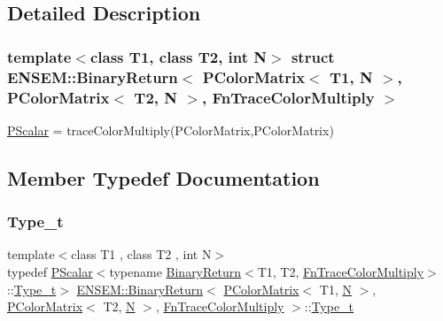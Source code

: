 \subsection{Detailed Description}
\subsubsection*{template$<$class T1, class T2, int N$>$\newline
struct E\+N\+S\+E\+M\+::\+Binary\+Return$<$ P\+Color\+Matrix$<$ T1, N $>$, P\+Color\+Matrix$<$ T2, N $>$, Fn\+Trace\+Color\+Multiply $>$}

\mbox{\hyperlink{classENSEM_1_1PScalar}{P\+Scalar}} = trace\+Color\+Multiply(\+P\+Color\+Matrix,\+P\+Color\+Matrix) 

\subsection{Member Typedef Documentation}
\mbox{\label{structENSEM_1_1BinaryReturn_3_01PColorMatrix_3_01T1_00_01N_01_4_00_01PColorMatrix_3_01T2_00_01N_a47a4c46ca38f78d2b12e618a0cca27a_a2e75e25e722e5b033ed977551768c19c}} 
\subsubsection{\texorpdfstring{Type\_t}{Type\_t}\hspace{0.1cm}{\footnotesize\ttfamily [1/2]}}
{\footnotesize\ttfamily template$<$class T1 , class T2 , int N$>$ \\
typedef \mbox{\hyperlink{classENSEM_1_1PScalar}{P\+Scalar}}$<$typename \mbox{\hyperlink{structENSEM_1_1BinaryReturn}{Binary\+Return}}$<$T1, T2, \mbox{\hyperlink{structENSEM_1_1FnTraceColorMultiply}{Fn\+Trace\+Color\+Multiply}}$>$\+::\mbox{\hyperlink{structENSEM_1_1BinaryReturn_3_01PColorMatrix_3_01T1_00_01N_01_4_00_01PColorMatrix_3_01T2_00_01N_a47a4c46ca38f78d2b12e618a0cca27a_a2e75e25e722e5b033ed977551768c19c}{Type\+\_\+t}}$>$ \mbox{\hyperlink{structENSEM_1_1BinaryReturn}{E\+N\+S\+E\+M\+::\+Binary\+Return}}$<$ \mbox{\hyperlink{classENSEM_1_1PColorMatrix}{P\+Color\+Matrix}}$<$ T1, \mbox{\hyperlink{operator__name__util_8cc_a7722c8ecbb62d99aee7ce68b1752f337}{N}} $>$, \mbox{\hyperlink{classENSEM_1_1PColorMatrix}{P\+Color\+Matrix}}$<$ T2, \mbox{\hyperlink{operator__name__util_8cc_a7722c8ecbb62d99aee7ce68b1752f337}{N}} $>$, \mbox{\hyperlink{structENSEM_1_1FnTraceColorMultiply}{Fn\+Trace\+Color\+Multiply}} $>$\+::\mbox{\hyperlink{structENSEM_1_1BinaryReturn_3_01PColorMatrix_3_01T1_00_01N_01_4_00_01PColorMatrix_3_01T2_00_01N_a47a4c46ca38f78d2b12e618a0cca27a_a2e75e25e722e5b033ed977551768c19c}{Type\+\_\+t}}}

